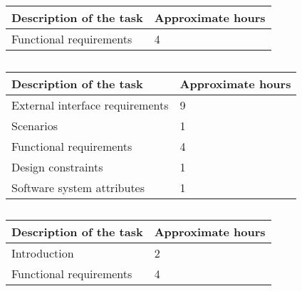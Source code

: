 
%

\subsection{}
\begin{table}[h!]
\begin{tabular}{|l|l|}
\hline
\textbf{Description of the task} & \textbf{Approximate hours} \\ \hline
Functional requirements & 4 \\ \hline
\end{tabular}
\end{table}

\subsection{}
\begin{table}[h!]
\begin{tabular}{|l|l|}
\hline
\textbf{Description of the task} & \textbf{Approximate hours} \\ \hline
External interface requirements & 9 \\ \hline
Scenarios & 1 \\ \hline
Functional requirements & 4 \\ \hline
Design constraints & 1 \\ \hline
Software system attributes & 1 \\ \hline
\end{tabular}
\end{table}

\subsection{}
\begin{table}[h!]
\begin{tabular}{|l|l|}
\hline
\textbf{Description of the task} & \textbf{Approximate hours} \\ \hline
Introduction & 2 \\ \hline
Functional requirements & 4 \\ \hline
\end{tabular}
\end{table}

%